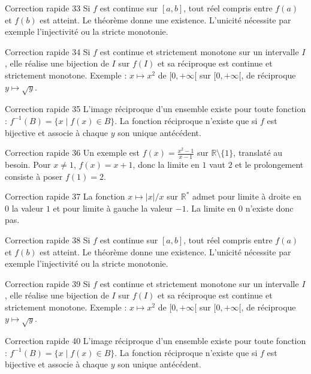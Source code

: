 \documentclass[11pt,a4paper]{article}
\newcommand{\R}{\mathbb{R}}
\begin{document}
\begin{corrbox}{Correction rapide 33}
Si $f$ est continue sur $[a,b]$, tout réel compris entre $f(a)$ et $f(b)$ est atteint. Le théorème donne une existence. L'unicité nécessite par exemple l'injectivité ou la stricte monotonie.
\end{corrbox}
\begin{corrbox}{Correction rapide 34}
Si $f$ est continue et strictement monotone sur un intervalle $I$, elle réalise une bijection de $I$ sur $f(I)$ et sa réciproque est continue et strictement monotone. Exemple : $x\mapsto x^2$ de $[0,+\infty[$ sur $[0,+\infty[$, de réciproque $y\mapsto\sqrt y$.
\end{corrbox}
\begin{corrbox}{Correction rapide 35}
L'image réciproque d'un ensemble existe pour toute fonction : $f^{-1}(B)=\{x\mid f(x)\in B\}$. La fonction réciproque n'existe que si $f$ est bijective et associe à chaque $y$ son unique antécédent.
\end{corrbox}
\begin{corrbox}{Correction rapide 36}
Un exemple est $f(x)=\frac{x^2-1}{x-1}$ sur $\R\setminus\{1\}$, translaté au besoin. Pour $x\neq1$, $f(x)=x+1$, donc la limite en $1$ vaut $2$ et le prolongement consiste à poser $f(1)=2$.
\end{corrbox}
\begin{corrbox}{Correction rapide 37}
La fonction $x\mapsto |x|/x$ sur $\R^*$ admet pour limite à droite en $0$ la valeur $1$ et pour limite à gauche la valeur $-1$. La limite en $0$ n'existe donc pas.
\end{corrbox}
\begin{corrbox}{Correction rapide 38}
Si $f$ est continue sur $[a,b]$, tout réel compris entre $f(a)$ et $f(b)$ est atteint. Le théorème donne une existence. L'unicité nécessite par exemple l'injectivité ou la stricte monotonie.
\end{corrbox}
\begin{corrbox}{Correction rapide 39}
Si $f$ est continue et strictement monotone sur un intervalle $I$, elle réalise une bijection de $I$ sur $f(I)$ et sa réciproque est continue et strictement monotone. Exemple : $x\mapsto x^2$ de $[0,+\infty[$ sur $[0,+\infty[$, de réciproque $y\mapsto\sqrt y$.
\end{corrbox}
\begin{corrbox}{Correction rapide 40}
L'image réciproque d'un ensemble existe pour toute fonction : $f^{-1}(B)=\{x\mid f(x)\in B\}$. La fonction réciproque n'existe que si $f$ est bijective et associe à chaque $y$ son unique antécédent.
\end{corrbox}
\end{document}
